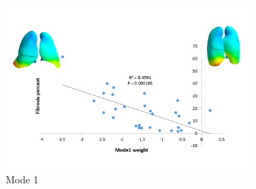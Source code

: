 \begin{figure}[H] 
\centering
\begin{subfigure}{.72\linewidth}%
  \includegraphics[width=\linewidth,trim={{.0\wd0} {.0\wd0} {.0\wd0} {.0\wd0}},clip]{QuantitativeAnalysis/Image/Mode1AgainstFibrosis.png} %
  \caption{Mode 1}
  \label{fig:ShapeVSFibrosis-a} 
\end{subfigure} 
\begin{subfigure}{.72\linewidth}%

\end{subfigure}
\end{figure}
